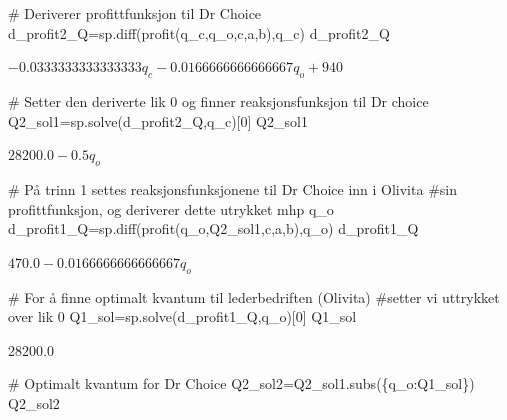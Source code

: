 \documentclass[
  12pt,
  a4paper,
  DIV=11,
  numbers=noendperiod]{scrartcl}
\newenvironment{Shaded}{\begin{snugshade}}{\end{snugshade}}
\newcommand{\CommentTok}[1]{\textcolor[rgb]{0.37,0.37,0.37}{#1}}
\newcommand{\DecValTok}[1]{\textcolor[rgb]{0.68,0.00,0.00}{#1}}
\newcommand{\NormalTok}[1]{\textcolor[rgb]{0.00,0.23,0.31}{#1}}
\newcommand{\OperatorTok}[1]{\textcolor[rgb]{0.37,0.37,0.37}{#1}}
\begin{document}
\begin{Shaded}
\begin{Highlighting}[]
\CommentTok{\# Deriverer profittfunksjon til Dr Choice}
\NormalTok{d\_profit2\_Q}\OperatorTok{=}\NormalTok{sp.diff(profit(q\_c,q\_o,c,a,b),q\_c)}
\NormalTok{d\_profit2\_Q}
\end{Highlighting}
\end{Shaded}

$\displaystyle - 0.0333333333333333 q_{c} - 0.0166666666666667 q_{o} + 940$

\begin{Shaded}
\begin{Highlighting}[]
\CommentTok{\# Setter den deriverte lik 0 og finner reaksjonsfunksjon til Dr choice}
\NormalTok{Q2\_sol1}\OperatorTok{=}\NormalTok{sp.solve(d\_profit2\_Q,q\_c)[}\DecValTok{0}\NormalTok{]}
\NormalTok{Q2\_sol1}
\end{Highlighting}
\end{Shaded}

$\displaystyle 28200.0 - 0.5 q_{o}$

\begin{Shaded}
\begin{Highlighting}[]
\CommentTok{\# På trinn 1 settes reaksjonsfunksjonene til Dr Choice inn i Olivita }
\CommentTok{\#sin profittfunksjon, og deriverer dette utrykket mhp q\_o}
\NormalTok{d\_profit1\_Q}\OperatorTok{=}\NormalTok{sp.diff(profit(q\_o,Q2\_sol1,c,a,b),q\_o)}
\NormalTok{d\_profit1\_Q}
\end{Highlighting}
\end{Shaded}

$\displaystyle 470.0 - 0.0166666666666667 q_{o}$

\begin{Shaded}
\begin{Highlighting}[]
\CommentTok{\# For å finne optimalt kvantum til lederbedriften (Olivita)}
\CommentTok{\#setter vi uttrykket over lik 0}
\NormalTok{Q1\_sol}\OperatorTok{=}\NormalTok{sp.solve(d\_profit1\_Q,q\_o)[}\DecValTok{0}\NormalTok{]}
\NormalTok{Q1\_sol}
\end{Highlighting}
\end{Shaded}

$\displaystyle 28200.0$

\begin{Shaded}
\begin{Highlighting}[]
\CommentTok{\# Optimalt kvantum for Dr Choice}
\NormalTok{Q2\_sol2}\OperatorTok{=}\NormalTok{Q2\_sol1.subs(\{q\_o:Q1\_sol\})}
\NormalTok{Q2\_sol2}
\end{Highlighting}
\end{Shaded}
\end{document}
